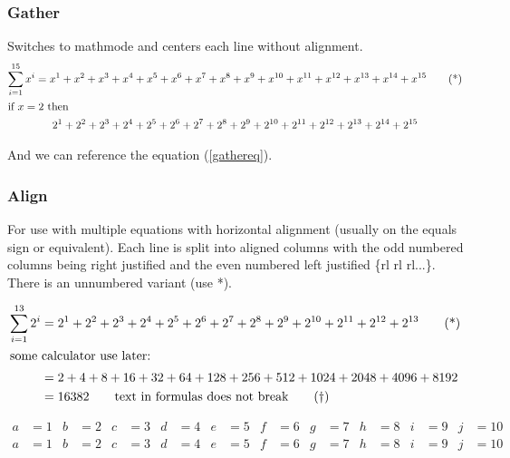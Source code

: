 \documentclass[12pt,a4paper]{article}
\theoremstyle{clearprint}
\begin{document}
\subsubsection[Gather]{Gather}

Switches to mathmode and centers each line without alignment.
\begin{gather}\label{gathereq}
\sum_{i=1}^{15} x^i = x^1 + x^2 + x^3 + x^4 + x^5 + x^6 + x^7 + x^8 + x^9 + x^{10} + x^{11} + x^{12} + x^{13} + x^{14} + x^{15}\tag{*}\\
\intertext{if $x=2$ then}
2^1 + 2^2 + 2^3 + 2^4 + 2^5 + 2^6 + 2^7 + 2^8 + 2^9 + 2^{10} + 2^{11} + 2^{12} + 2^{13} + 2^{14} + 2^{15}\notag
\end{gather}

And we can reference the equation (\ref{gathereq}).

\subsubsection[Align]{Align}


For use with multiple equations with horizontal alignment (usually on the equals sign or equivalent). Each line is split into aligned columns with the odd numbered columns being right justified and the even numbered left justified \{rl rl rl...\}. There is an unnumbered variant (use *). 

\begin{align}\label{alignlab}
\sum_{i=1}^{13} 2^i &= 2^1 + 2^2 + 2^3 + 2^4 + 2^5 + 2^6 + 2^7 + 2^8 + 2^9 + 2^{10} + 2^{11} + 2^{12} + 2^{13}\tag{*}\\
\intertext{some calculator use later:}
&=2 + 4 + 8 + 16 + 32 + 64 + 128 + 256 + 512 + 1024 + 2048 + 4096 + 8192 \notag\\
&=16382 \qquad\text{text in formulas does not break} \tag{$\dagger$}
\end{align}

\begin{align*}
a &= 1 & b &= 2 & c &= 3 & d &= 4 & e &=5 & f &= 6 & g &= 7 & h &= 8 & i &= 9 & j &=10\\
a &= 1 & b &= 2 & c &= 3 & d &= 4 & e &=5 & f &= 6 & g &= 7 & h &= 8 & i &= 9 & j &=10
\end{align*}
\end{document}
